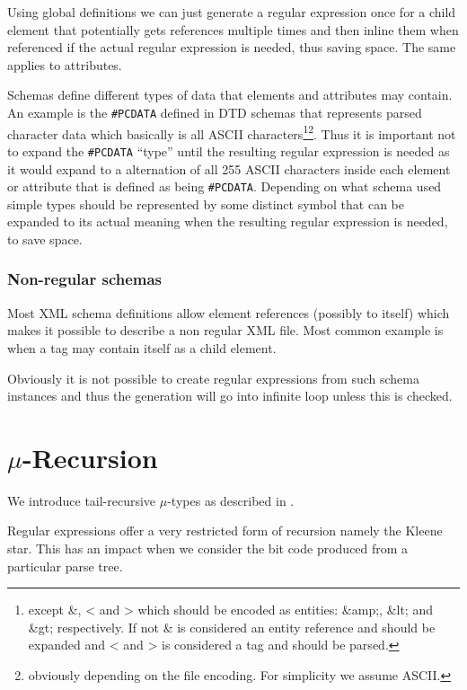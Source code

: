 \documentclass[a4paper, oneside]{memoir}
\theoremstyle{definition}
\begin{document}
Using global definitions we can just generate a regular expression once for a
child element that potentially gets references multiple times and then inline
them when referenced if the actual regular expression is needed, thus saving
space. The same applies to attributes.
\label{sec:global-definitions-save-space}

Schemas define different types of data that elements and attributes may
contain. An example is the \texttt{\#PCDATA} defined in DTD schemas that
represents parsed character data which basically is all ASCII
characters\footnote{except \&, < and > which should be encoded as entities:
  \&amp;, \&lt; and \&gt; respectively. If not \& is considered an entity
  reference and should be expanded and < and > is considered a tag and should be
  parsed.}\footnote{obviously depending on the file encoding. For simplicity we
  assume ASCII.}. Thus it is important not to expand the \texttt{\#PCDATA}
``type'' until the resulting regular expression is needed as it would expand to
a alternation of all 255 ASCII characters inside each element or attribute that
is defined as being \texttt{\#PCDATA}. Depending on what schema used simple
types should be represented by some distinct symbol that can be expanded to its
actual meaning when the resulting regular expression is needed, to save space.

\subsection{Non-regular schemas}

Most XML schema definitions allow element references (possibly to itself) which
makes it possible to describe a non regular XML file. Most common example is
when a tag may contain itself as a child element.

Obviously it is not possible to create regular expressions from such schema
instances and thus the generation will go into infinite loop unless this is
checked.

\chapter{$\mu$-Recursion}
\label{chap:mu-recursion}

We introduce tail-recursive $\mu$-types as described in \cite{heni2010}.

Regular expressions offer a very restricted form of recursion namely the Kleene
star. This has an impact when we consider the bit code produced from a
particular parse tree.
\end{document}
